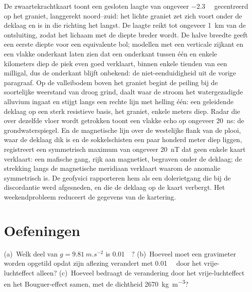 \begin{example}\label{ex:b3:field-lab-methods-3:varden}
De zwaartekrachtkaart toont een gesloten laagte van ongeveer \qty{-2.3}{\milli\gal}
gecentreerd op het graniet, langgerekt noord--zuid: het lichte graniet
zet zich voort onder de deklaag en is in die richting het langst. De laagte
reikt tot ongeveer \qty{1}{km} van de ontsluiting, zodat het lichaam met de
diepte breder wordt. De halve breedte geeft een eerste diepte voor een equivalente bol;
modellen met een verticale zijkant en een vlakke onderkant laten zien dat een onderkant
tussen één en enkele kilometers diep de piek even goed verklaart, binnen enkele
tienden van een milligal, dus de onderkant blijft onbekend: de niet-eenduidigheid
uit de vorige paragraaf. Op de valleibodem boven het graniet begint de
peiling bij de soortelijke weerstand van droog grind, daalt waar de
stroom het watergezadigde alluvium ingaat en stijgt langs een rechte
lijn met helling één: een geleidende deklaag op een sterk resistieve basis, het
graniet, enkele meters diep. Radar die over dezelfde vloer wordt getrokken toont een
vlakke echo op ongeveer \qty{20}{ns}: de grondwaterspiegel. En de magnetische lijn
over de westelijke flank van de plooi, waar de deklaag dik is en de
sokkelschisten een paar honderd meter diep liggen, registreert een
symmetrisch maximum van ongeveer \qty{20}{nT} dat geen enkele kaart verklaart: een mafische
gang, rijk aan magnetiet, begraven onder de deklaag; de strekking langs de
magnetische meridiaan verklaart waarom de anomalie symmetrisch is. De geofysici
rapporteren hem als een dolerietgang die bij de discordantie werd afgesneden,
en die de deklaag op de kaart verbergt. Het weekendprobleem reduceert de gegevens
van de kartering.
\end{example}

\section{Oefeningen}

\begin{exercise}[$\star$]\label{exo:b3:field-lab-methods-3:1}
(a)~Welk deel van $g = \qty{9.81}{m.s^{-2}}$ is \qty{0.01}{\milli\gal}?
(b)~Hoeveel moet een gravimeter worden opgetild opdat zijn aflezing verandert
met \qty{0.01}{\milli\gal} door het vrije-luchteffect alleen? (c)~Hoeveel
bedraagt de verandering door het vrije-luchteffect en het Bouguer-effect samen, met de dichtheid
\qty{2670}{kg.m^{-3}}?
\end{exercise}

